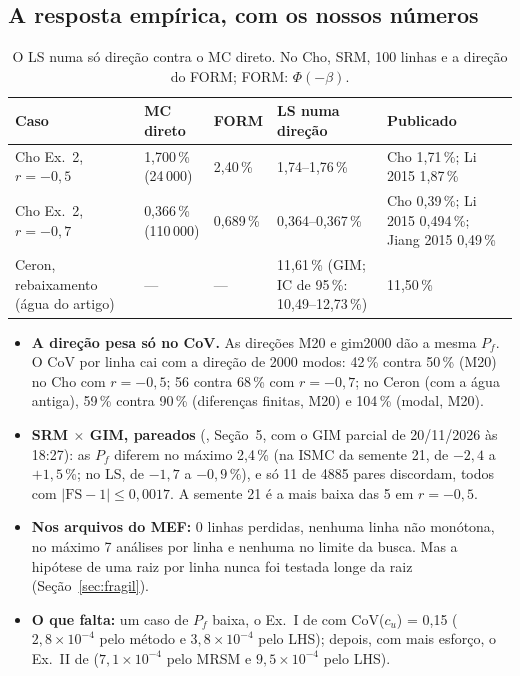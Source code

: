 \documentclass[11pt,a4paper]{article}
\newcommand{\sci}[2]{\ensuremath{#1\times10^{#2}}}
\begin{document}
\subsection{A resposta empírica, com os nossos números}\label{sec:empirica}
\begin{table}[H]\centering\small\setlength{\tabcolsep}{4pt}
\caption{O LS numa só direção contra o MC direto. No Cho, SRM, 100 linhas e a direção do FORM; FORM: $\Phi(-\beta)$.}
\label{tab:empirica}
\begin{tabular}{L{3.0cm}L{2.6cm}L{1.5cm}L{4.1cm}L{3.9cm}}
\toprule
Caso & MC direto & FORM & LS numa direção & Publicado \\
\midrule
Cho Ex.~2, $r = -0{,}5$ & 1,700\,\% (24\,000) & 2,40\,\% & 1,74--1,76\,\% & Cho 1,71\,\%; Li 2015 1,87\,\% \\
Cho Ex.~2, $r = -0{,}7$ & 0,366\,\% (110\,000) & 0,689\,\% & 0,364--0,367\,\% & Cho 0,39\,\%; Li 2015 0,494\,\%;
  Jiang 2015 0,49\,\% \\
Ceron, rebaixamento (água do artigo) & --- & --- & 11,61\,\% (GIM; IC de 95\,\%: 10,49--12,73\,\%) & 11,50\,\% \\
\bottomrule
\end{tabular}
\end{table}
\begin{itemize}
  \item \textbf{A direção pesa só no CoV.} As direções M20 e gim2000 dão a mesma $P_f$. O CoV por linha cai com a direção
    de 2000 modos: 42\,\% contra 50\,\% (M20) no Cho com $r = -0{,}5$; 56 contra 68\,\% com $r = -0{,}7$; no Ceron
    (com a água antiga), 59\,\% contra 90\,\% (diferenças finitas, M20) e 104\,\% (modal, M20).
  \item \textbf{SRM $\times$ GIM, pareados} (, Seção~5, com o GIM
    parcial de 20/11/2026 às 18:27): as $P_f$ diferem
    no máximo 2,4\,\% (na ISMC da semente 21, de $-2{,}4$ a $+1{,}5$\,\%; no LS, de $-1{,}7$ a $-0{,}9$\,\%), e só 11 de
    4885 pares discordam, todos com $|\mathrm{FS} - 1| \le 0{,}0017$. A semente 21 é a mais baixa das 5 em
    $r = -0{,}5$.
  \item \textbf{Nos arquivos do MEF:} 0 linhas perdidas, nenhuma linha não monótona, no máximo 7 análises por linha e
    nenhuma no limite da busca. Mas a hipótese de uma raiz por linha nunca foi testada longe da raiz
    (Seção~\ref{sec:fragil}).
  \item \textbf{O que falta:} um caso de $P_f$ baixa, o Ex.~I de \citet{jiang2015} com CoV($c_u$) = 0,15
    (\sci{2{,}8}{-4} pelo método e \sci{3{,}8}{-4} pelo LHS); depois, com mais esforço, o Ex.~II de \citet{li2015}
    (\sci{7{,}1}{-4} pelo MRSM e \sci{9{,}5}{-4} pelo LHS).
\end{itemize}
\end{document}
